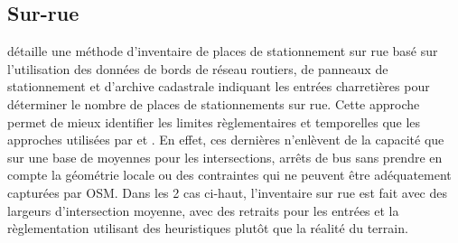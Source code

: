 \subsection{Sur-rue}
\textcite{Bourdeau:MethodologieAnalyse:2014} détaille une méthode d'inventaire de places de stationnement sur rue basé sur l'utilisation des données de bords de réseau routiers, de panneaux de stationnement et d'archive cadastrale indiquant les entrées charretières pour déterminer le nombre de places de stationnements sur rue. Cette approche permet de mieux identifier les limites règlementaires et temporelles que les approches utilisées par \textcite{Chester:InventoryingSan:2022} et \textcite{Scharnhorst:QuantifiedParking:2018}. En effet, ces dernières n'enlèvent de la capacité que sur une base de moyennes pour les intersections, arrêts de bus sans prendre en compte la géométrie locale ou des contraintes qui ne peuvent être adéquatement capturées par \ac{OSM}. Dans les 2 cas ci-haut, l'inventaire sur rue est fait avec des largeurs d'intersection moyenne, avec des retraits pour les entrées et la règlementation utilisant des heuristiques plutôt que la réalité du terrain. \par

